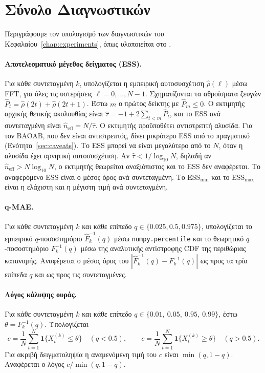 \section{Σύνολο Διαγνωστικών}
\label{sec:app-metrics}

Περιγράφουμε τον υπολογισμό των διαγνωστικών του
Κεφαλαίου~\ref{chap:experiments}, όπως υλοποιείται στο
.

\paragraph{Αποτελεσματικό μέγεθος δείγματος (ESS).}
Για κάθε συντεταγμένη $k$, υπολογίζεται η εμπειρική αυτοσυσχέτιση
$\hat\rho(\ell)$ μέσω FFT, για όλες τις υστερήσεις $\ell = 0, \ldots, N-1$.
Σχηματίζονται τα αθροίσματα ζευγών $\hat P_t = \hat\rho(2t) + \hat\rho(2t+1)$.
Έστω $m$ ο πρώτος δείκτης με $\hat P_m \le 0$. Ο εκτιμητής αρχικής θετικής
ακολουθίας \citep{geyer1992practical} είναι
$\hat\tau = -1 + 2\sum_{t<m} \hat P_t$, και το ESS ανά συντεταγμένη είναι
$\hat n_\mathrm{eff} = N / \hat\tau$. Ο εκτιμητής προϋποθέτει αντιστρεπτή αλυσίδα. Για
τον BAOAB, που δεν είναι αντιστρεπτός, δίνει μικρότερο ESS από το πραγματικό
(Ενότητα~\ref{sec:caveats}). Το ESS μπορεί να είναι μεγαλύτερο από το
$N$, όταν η αλυσίδα έχει αρνητική αυτοσυσχέτιση. Αν $\hat\tau < 1/\log_{10} N$,
δηλαδή αν $\hat n_\mathrm{eff} > N \log_{10} N$, ο εκτιμητής θεωρείται αναξιόπιστος
και το ESS δεν αναφέρεται. Το αναφερόμενο ESS είναι ο μέσος όρος ανά συντεταγμένη.
Το ESS$_{\min}$ και το ESS$_{\max}$ είναι η ελάχιστη και η μέγιστη τιμή ανά συντεταγμένη.

\paragraph{q-MAE.}
Για κάθε συντεταγμένη $k$ και κάθε επίπεδο $q \in \{0.025, 0.5, 0.975\}$,
υπολογίζεται το εμπειρικό $q$-ποσοστημόριο $\hat F_k^{-1}(q)$ μέσω
\texttt{numpy.percentile} και το θεωρητικό $q$-ποσοστημόριο
$F_k^{-1}(q)$ μέσω της αναλυτικής αντίστροφης CDF της περιθώριας κατανομής.
Αναφέρεται ο μέσος όρος του
$|\hat F_k^{-1}(q) - F_k^{-1}(q)|$ ως προς τα τρία επίπεδα $q$ και ως προς τις συντεταγμένες.

\paragraph{Λόγος κάλυψης ουράς.}
Για κάθε συντεταγμένη $k$ και κάθε επίπεδο $q \in \{0.01,\allowbreak\ 0.05,\allowbreak\ 0.95,\allowbreak\
0.99\}$, έστω $\theta = F_k^{-1}(q)$. Υπολογίζεται
\[
  c = \frac{1}{N}\sum_{t=1}^N \mathbf{1}\{X_t^{(k)} \leq \theta\} \quad (q < 0.5),
  \qquad
  c = \frac{1}{N}\sum_{t=1}^N \mathbf{1}\{X_t^{(k)} \geq \theta\} \quad (q > 0.5).
\]
Για ακριβή δειγματοληψία η αναμενόμενη τιμή του $c$ είναι
$\min(q, 1-q)$. Αναφέρεται ο λόγος $c / \min(q, 1-q)$.

